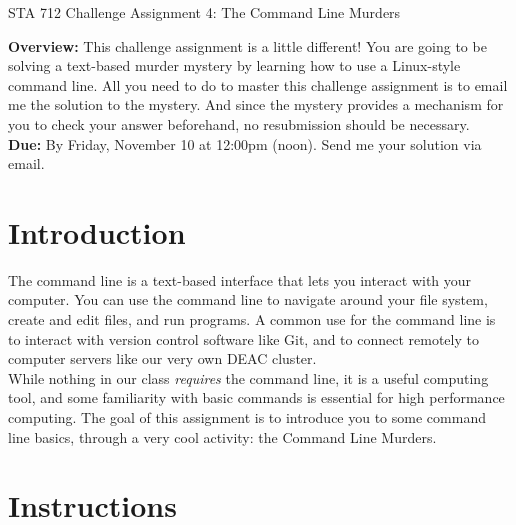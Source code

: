 \documentclass[11pt]{article}
\begin{document}
\begin{center}
\Large
STA 712 Challenge Assignment 4: The Command Line Murders\\
\normalsize
\vspace{5mm}
\end{center}

\noindent \textbf{Overview:} This challenge assignment is a little different! You are going to be solving a text-based murder mystery by learning how to use a Linux-style command line. All you need to do to master this challenge assignment is to email me the solution to the mystery. And since the mystery provides a mechanism for you to check your answer beforehand, no resubmission should be necessary.\\

\noindent \textbf{Due:} By Friday, November 10 at 12:00pm (noon). Send me your solution via email.\\

\section*{Introduction}

The command line is a text-based interface that lets you interact with your computer. You can use the command line to navigate around your file system, create and edit files, and run programs. A common use for the command line is to interact with version control software like Git, and to connect remotely to computer servers like our very own DEAC cluster.\\

\noindent While nothing in our class \textit{requires} the command line, it is a useful computing tool, and some familiarity with basic commands is essential for high performance computing. The goal of this assignment is to introduce you to some command line basics, through a very cool activity: the Command Line Murders.

\section*{Instructions}
\end{document}
